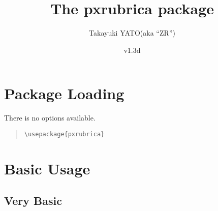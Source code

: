 \documentclass[a4paper]{article}
\newcommand*{\PKN}[1]{\textsf{#1}}
\newcommand*{\myfileversion}{1.3d}
\newcommand*{\myfiledate}{2021/03/06}
\begin{document}
\title{The \PKN{pxrubrica} package}
\author{Takayuki YATO\quad (aka ``ZR'')}
\date{v\myfileversion \quad[\myfiledate]}
\maketitle


\section{Package Loading}

There is no options available.

\begin{quote}\small\begin{verbatim}
\usepackage{pxrubrica}
\end{verbatim}\end{quote}

\section{Basic Usage}

\subsection{Very Basic}
\end{document}
